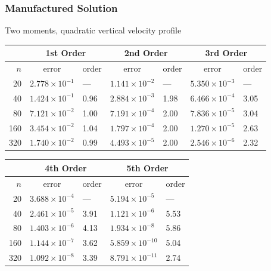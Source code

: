 \documentclass[10pt]{beamer}
\begin{document}
    \begin{frame}
        \frametitle{Manufactured Solution}
        Two moments, quadratic vertical velocity profile
        \footnotesize
        \begin{table}
          \centering
          \begin{tabular}{r*{6}l}
            \toprule
            & \multicolumn{2}{c}{1st Order} & \multicolumn{2}{c}{2nd Order} & \multicolumn{2}{c}{3rd Order} \\
            \midrule
            \(n\) & \multicolumn{1}{c}{error} & order & \multicolumn{1}{c}{error} & order & \multicolumn{1}{c}{error} & order\\
            \midrule
             20 & \( 2.778 \times 10^{-1} \) &  --- & \( 1.141 \times 10^{-2} \) &  --- & \( 5.350 \times 10^{-3} \) &  --- \\
             40 & \( 1.424 \times 10^{-1} \) & 0.96 & \( 2.884 \times 10^{-3} \) & 1.98 & \( 6.466 \times 10^{-4} \) & 3.05 \\
             80 & \( 7.121 \times 10^{-2} \) & 1.00 & \( 7.191 \times 10^{-4} \) & 2.00 & \( 7.836 \times 10^{-5} \) & 3.04 \\
            160 & \( 3.454 \times 10^{-2} \) & 1.04 & \( 1.797 \times 10^{-4} \) & 2.00 & \( 1.270 \times 10^{-5} \) & 2.63 \\
            320 & \( 1.740 \times 10^{-2} \) & 0.99 & \( 4.493 \times 10^{-5} \) & 2.00 & \( 2.546 \times 10^{-6} \) & 2.32 \\
            \bottomrule
          \end{tabular}
        \end{table}
        \begin{table}
          \centering
          \begin{tabular}{r*{4}l}
            \toprule
            & \multicolumn{2}{c}{4th Order} & \multicolumn{2}{c}{5th Order} \\
            \midrule
            \(n\) & \multicolumn{1}{c}{error} & order & \multicolumn{1}{c}{error} & order \\
            \midrule
             20 & \( 3.688 \times 10^{ -4} \) &  --- & \( 5.194 \times 10^{ -5} \) &  --- \\
             40 & \( 2.461 \times 10^{ -5} \) & 3.91 & \( 1.121 \times 10^{ -6} \) & 5.53 \\
             80 & \( 1.403 \times 10^{ -6} \) & 4.13 & \( 1.934 \times 10^{ -8} \) & 5.86 \\
            160 & \( 1.144 \times 10^{ -7} \) & 3.62 & \( 5.859 \times 10^{-10} \) & 5.04 \\
            320 & \( 1.092 \times 10^{ -8} \) & 3.39 & \( 8.791 \times 10^{-11} \) & 2.74 \\
            \bottomrule
          \end{tabular}
        \end{table}
    \end{frame}
\end{document}
